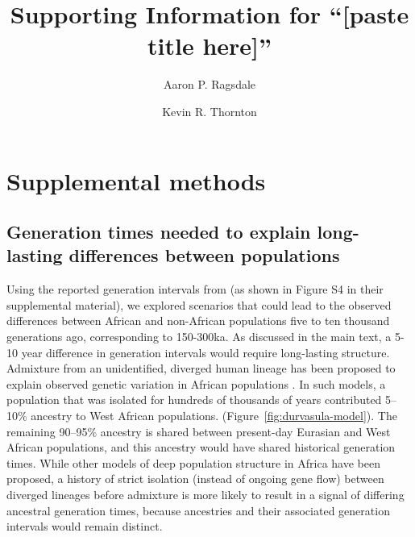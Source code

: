 \documentclass[]{article}
\title{Supporting Information for ``[paste title here]''}
\author[1,*]{Aaron P. Ragsdale}
\author[2]{Kevin R. Thornton}
\affil[1]{University of Wisconsin--Madison, Wisconsin, USA}
\affil[2]{University of California, Irvine, California, USA}
\affil[*]{apragsdale@wisc.edu}
\begin{document}
\maketitle

\renewcommand{\thefigure}{S\arabic{figure}}
\renewcommand{\thetable}{S\arabic{table}}
\renewcommand{\theequation}{S\arabic{equation}}
\setcounter{figure}{0}
\setcounter{table}{0}
\setcounter{equation}{0}

\section*{Supplemental methods}

\subsection*{Generation times needed to explain long-lasting differences between populations}

Using the reported generation intervals from \citet{wang2023human} (as shown in
Figure S4 in their supplemental material), we explored scenarios that could
lead to the observed differences between African and non-African populations
five to ten thousand generations ago, corresponding to 150-300ka. As discussed
in the main text, a 5-10 year difference in generation intervals would require
long-lasting structure. Admixture from an unidentified, diverged human lineage
has been proposed to explain observed genetic variation in African populations
\citep[e.g.,][but see \citet{ragsdale2022weakly} for alternative models that
allow for ongoing gene flow between
lineages]{hey2018phylogeny,durvasula2020recovering,lorente2019whole}. In such
models, a population that was isolated for hundreds of thousands of years
contributed 5--10\% ancestry to West African populations.
(Figure~\ref{fig:durvasula-model}). The remaining 90--95\% ancestry is shared
between present-day Eurasian and West African populations, and this ancestry
would have shared historical generation times. While other models of deep
population structure in Africa have been proposed, a history of strict
isolation (instead of ongoing gene flow) between diverged lineages before
admixture is more likely to result in a signal of differing ancestral
generation times, because ancestries and their associated generation intervals
would remain distinct.
\end{document}
